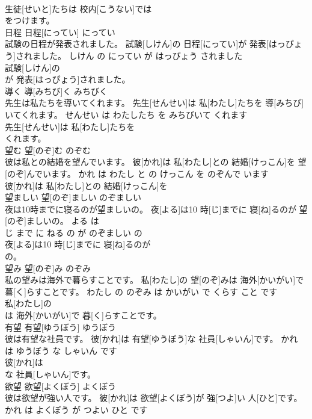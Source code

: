\documentclass[8pt]{extreport}
\begin{document}
\begin{CJK}{UTF8}{min}
\\	生徒[せいと]たちは 校内[こうない]では
\\	をつけます。			
\\	日程	日程[にってい]	にってい	
\\	試験の日程が発表されました。	試験[しけん]の 日程[にってい]が 発表[はっぴょう]されました。	しけん の にってい が はっぴょう されました	
\\	試験[しけん]の
\\	が 発表[はっぴょう]されました。			
\\	導く	導[みちび]く	みちびく	
\\	先生は私たちを導いてくれます。	先生[せんせい]は 私[わたし]たちを 導[みちび]いてくれます。	せんせい は わたしたち を みちびいて くれます	
\\	先生[せんせい]は 私[わたし]たちを
\\	くれます。			
\\	望む	望[のぞ]む	のぞむ	
\\	彼は私との結婚を望んでいます。	彼[かれ]は 私[わたし]との 結婚[けっこん]を 望[のぞ]んでいます。	かれ は わたし と の けっこん を のぞんで います	
\\	彼[かれ]は 私[わたし]との 結婚[けっこん]を
\\	望ましい	望[のぞ]ましい	のぞましい	
\\	夜は10時までに寝るのが望ましいの。	夜[よる]は10 時[じ]までに 寝[ね]るのが 望[のぞ]ましいの。	よる は 
\\	じ まで に ねる の が のぞましい の	
\\	夜[よる]は10 時[じ]までに 寝[ね]るのが
\\	の。			
\\	望み	望[のぞ]み	のぞみ	
\\	私の望みは海外で暮らすことです。	私[わたし]の 望[のぞ]みは 海外[かいがい]で 暮[く]らすことです。	わたし の のぞみ は かいがい で くらす こと です	
\\	私[わたし]の
\\	は 海外[かいがい]で 暮[く]らすことです。			
\\	有望	有望[ゆうぼう]	ゆうぼう	
\\	彼は有望な社員です。	彼[かれ]は 有望[ゆうぼう]な 社員[しゃいん]です。	かれ は ゆうぼう な しゃいん です	
\\	彼[かれ]は
\\	な 社員[しゃいん]です。			
\\	欲望	欲望[よくぼう]	よくぼう	
\\	彼は欲望が強い人です。	彼[かれ]は 欲望[よくぼう]が 強[つよ]い 人[ひと]です。	かれ は よくぼう が つよい ひと です	

\end{CJK}
\end{document}
